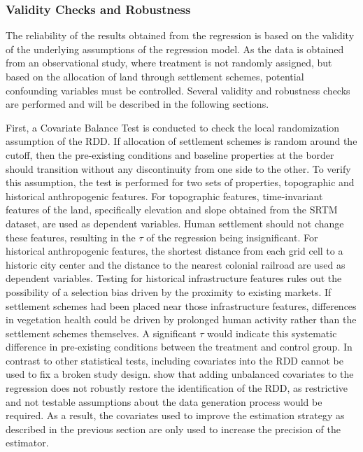 \subsubsection{Validity Checks and Robustness}

The reliability of the results obtained from the regression is based on the validity of the underlying assumptions of the regression model.
As the data is obtained from an observational study, where treatment is not randomly assigned, but based on the allocation of land through settlement schemes, potential confounding variables must be controlled.
Several validity and robustness checks are performed and will be described in the following sections.

First, a Covariate Balance Test is conducted to check the local randomization assumption of the RDD.
If allocation of settlement schemes is random around the cutoff, then the pre-existing conditions and baseline properties at the border should transition without any discontinuity from one side to the other.
To verify this assumption, the test is performed for two sets of properties, topographic and historical anthropogenic features.
For topographic features, time-invariant features of the land, specifically elevation and slope obtained from the SRTM dataset, are used as dependent variables.
Human settlement should not change these features, resulting in the $\tau$ of the regression being insignificant.
For historical anthropogenic features, the shortest distance from each grid cell to a historic city center and the distance to the nearest colonial railroad are used as dependent variables.
Testing for historical infrastructure features rules out the possibility of a selection bias driven by the proximity to existing markets.
If settlement schemes had been placed near those infrastructure features, differences in vegetation health could be driven by prolonged human activity rather than the settlement schemes themselves.
A significant $\tau$ would indicate this systematic difference in pre-existing conditions between the treatment and control group.
In contrast to other statistical tests, including covariates into the RDD cannot be used to fix a broken study design.
\textcite{cattaneoCovariateAdjustmentRegression2023} show that adding unbalanced covariates to the regression does not robustly restore the identification of the RDD,
as restrictive and not testable assumptions about the data generation process would be required.
As a result, the covariates used to improve the estimation strategy as described in the previous section are only used to increase the precision of the estimator.


